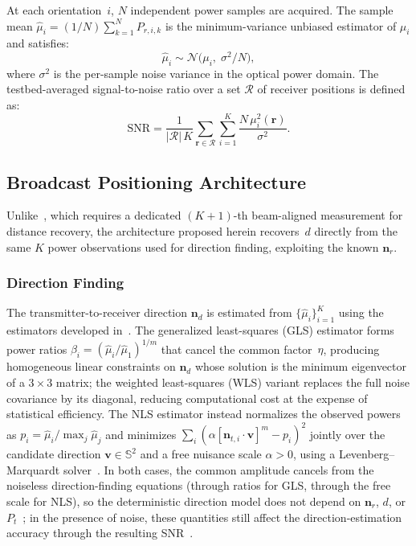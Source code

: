 \documentclass[conference]{IEEEtran}
\begin{document}
At each orientation~$i$, $N$ independent power samples are acquired. The sample mean $\hat\mu_i = (1/N)\sum_{k=1}^N P_{r,i,k}$ is the minimum-variance unbiased estimator of $\mu_i$ and satisfies:
\begin{equation}
\hat\mu_i \sim \mathcal{N}\bigl(\mu_i,\;\sigma^2/N\bigr),
\label{eq:obs_model}
\end{equation}
where $\sigma^2$ is the per-sample noise variance in the optical power domain.
The testbed-averaged signal-to-noise ratio over a set $\mathcal{R}$ of receiver positions is defined as:
\begin{equation}
\mathrm{SNR} = \frac{1}{|\mathcal{R}|\,K}\sum_{\mathbf{r}\in\mathcal{R}}\sum_{i=1}^K \frac{N\,\mu_i^2(\mathbf{r})}{\sigma^2}.
\label{eq:snr_def}
\end{equation}

\subsection{Broadcast Positioning Architecture}
\label{subsec:broadcast_arch}

Unlike~\cite{AcunaTCOM2025}, which requires a dedicated $(K{+}1)$-th beam-aligned measurement for distance recovery, the architecture proposed herein recovers~$d$ directly from the same $K$ power observations used for direction finding, exploiting the known $\mathbf{n}_r$.

\subsubsection{Direction Finding}
The transmitter-to-receiver direction $\mathbf{n}_d$ is estimated from $\{\hat\mu_i\}_{i=1}^K$ using the estimators developed in~\cite{AcunaTCOM2025}.
The generalized least-squares (GLS) estimator forms power ratios $\beta_i=(\hat\mu_i/\hat\mu_1)^{1/m}$ that cancel the common factor~$\eta$, producing homogeneous linear constraints on $\mathbf{n}_d$ whose solution is the minimum eigenvector of a $3{\times}3$ matrix; the weighted least-squares (WLS) variant replaces the full noise covariance by its diagonal, reducing computational cost at the expense of statistical efficiency.
The NLS estimator instead normalizes the observed powers as $p_i = \hat\mu_i/\max_j \hat\mu_j$ and minimizes $\sum_i(\alpha[\mathbf{n}_{t,i}{\cdot}\mathbf{v}]^m - p_i)^2$ jointly over the candidate direction $\mathbf{v}\in\mathbb{S}^2$ and a free nuisance scale $\alpha>0$, using a Levenberg--Marquardt solver~\cite{AcunaTCOM2025}.
In both cases, the common amplitude cancels from the noiseless direction-finding equations (through ratios for GLS, through the free scale for NLS), so the deterministic direction model does not depend on $\mathbf{n}_r$, $d$, or $P_t$~\cite{AcunaTCOM2025}; in the presence of noise, these quantities still affect the direction-estimation accuracy through the resulting SNR~\cite{AcunaCondori2026ICC}.
\end{document}
